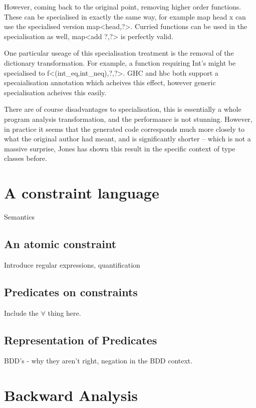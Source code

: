 \documentclass[preprint]{sigplanconf}
\begin{document}
However, coming back to the original point, removing higher order functions.
These can be specialised in exactly the same way, for example map head x can
use the specialised version map<head,?>. Curried functions can be used in the
specialisation as well, map<add ?,?> is perfectly valid.

One particular useage of this specialisation treatment is the removal of the
dictionary transformation. For example, a function requiring Int's might be
specialised to f<(int_eq,int_neq),?,?>. GHC and hbc both support a
specaialisation annotation which acheives this effect, however generic
specialisation acheives this easily.

There are of course disadvantages to specialisation, this is essentially a
whole program analysis transformation, and the performance is not stunning.
However, in practice it seems that the generated code corresponds much more
closely to what the original author had meant, and is significantly shorter --
which is not a massive surprise, Jones has shown this result in the specific
context of type classes before.

\section{A constraint language}
\label{chap:constraints}

Semantics

\subsection{An atomic constraint}

Introduce regular expressions, quantification


\subsection{Predicates on constraints}

Include the $\forall$ thing here.

\subsection{Representation of Predicates}

BDD's - why they aren't right, negation in the BDD context.

\section{Backward Analysis}
\label{chap:backward}
\end{document}
